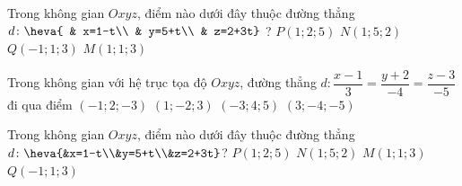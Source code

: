 \begin{ex}%
	Trong không gian $Oxyz$, điểm nào dưới đây thuộc đường thẳng $d\colon\heva{
		& x=1-t\\ 
		& y=5+t\\ 
		& z=2+3t}$ ?
	\choice
	{$P\left(1;2;5\right)$}
	{\True $N\left(1;5;2\right)$}
	{$Q\left(-1;1;3\right)$}
	{$M\left(1;1;3\right)$}
\end{ex}

\begin{ex}%
	Trong không gian với hệ trục tọa độ $Oxyz$, đường thẳng $ d\colon \dfrac{x-1}{3}=\dfrac{y+2}{-4}=\dfrac{z-3}{-5}$ đi qua điểm
	\choice
	{$\left(-1;2;-3\right)$}
	{\True $\left(1;-2;3\right)$}
	{$\left(-3;4;5\right)$}
	{$\left(3;-4;-5\right)$}
	\loigiai{
	}
\end{ex}

\begin{ex}%
	Trong không gian $Oxyz$, điểm nào dưới đây thuộc đường thẳng $d\colon \heva{&x=1-t\\&y=5+t\\&z=2+3t}$?
	\choice
	{$P(1;2;5)$}
	{\True $N(1;5;2)$ }
	{$M(1;1;3)$}
	{$Q(-1;1;3)$}
\end{ex}

